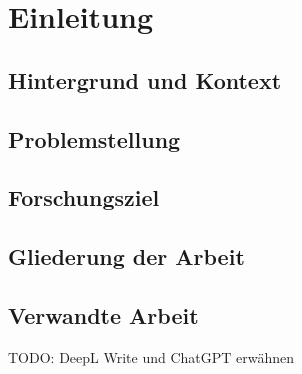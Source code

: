 \chapter{Einleitung}
\section{Hintergrund und Kontext}
\section{Problemstellung}
\section{Forschungsziel}
\section{Gliederung der Arbeit}
\section{Verwandte Arbeit}

 TODO: DeepL Write und ChatGPT erwähnen
 